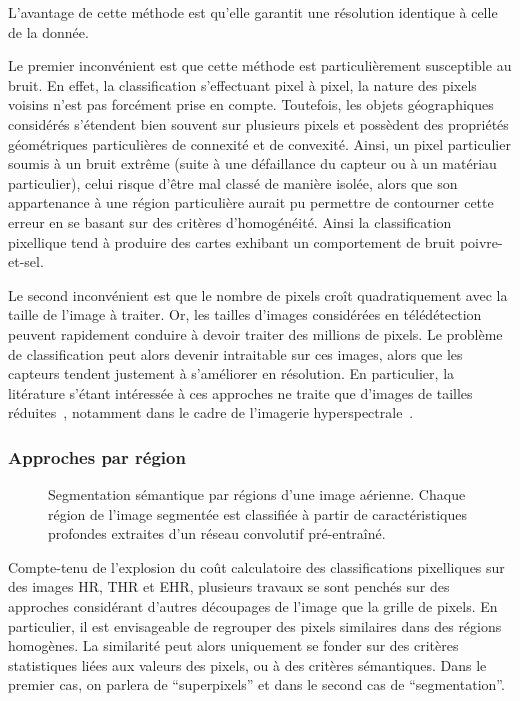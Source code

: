 L'avantage de cette méthode est qu'elle garantit une résolution identique à celle de la donnée.

Le premier inconvénient est que cette méthode est particulièrement susceptible au bruit. En effet, la classification s'effectuant pixel à pixel, la nature des pixels voisins n'est pas forcément prise en compte. Toutefois, les objets géographiques considérés s'étendent bien souvent sur plusieurs pixels et possèdent des propriétés géométriques particulières de connexité et de convexité. Ainsi, un pixel particulier soumis à un bruit extrême (suite à une défaillance du capteur ou à un matériau particulier), celui risque d'être mal classé de manière isolée, alors que son appartenance à une région particulière aurait pu permettre de contourner cette erreur en se basant sur des critères d'homogénéité. Ainsi la classification pixellique tend à produire des cartes exhibant un comportement de bruit poivre-et-sel.

Le second inconvénient est que le nombre de pixels croît quadratiquement avec la taille de l'image à traiter. Or, les tailles d'images considérées en télédétection peuvent rapidement conduire à devoir traiter des millions de pixels. Le problème de classification peut alors devenir intraitable sur ces images, alors que les capteurs tendent justement à s'améliorer en résolution. En particulier, la litérature s'étant intéressée à ces approches ne traite que d'images de tailles réduites~\cite{nogueira_learning_2016}, notamment dans le cadre de l'imagerie hyperspectrale~\cite{fauvel_advances_2013}.

\subsubsection{Approches par région}

\begin{figure}
\resizebox{\textwidth}{!}{%

}
\caption{Segmentation sémantique par régions d'une image aérienne. Chaque région de l'image segmentée est classifiée à partir de caractéristiques profondes extraites d'un réseau convolutif pré-entraîné.}
\label{fig:framework}
\end{figure}

Compte-tenu de l'explosion du coût calculatoire des classifications pixelliques sur des images \gls{HR}, \gls{THR} et \gls{EHR}, plusieurs travaux se sont penchés sur des approches considérant d'autres découpages de l'image que la grille de pixels. En particulier, il est envisageable de regrouper des pixels similaires dans des régions homogènes. La similarité peut alors uniquement se fonder sur des critères statistiques liées aux valeurs des pixels, ou à des critères sémantiques. Dans le premier cas, on parlera de ``superpixels'' et dans le second cas de ``segmentation''.

